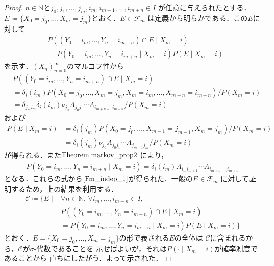\documentclass[dvipdfmx,autodetect-engine]{jsarticle}
\theoremstyle{remark}
\theoremstyle{definition}
\newcommand{\N}{\mathbb{N}}
\begin{document}
\begin{proof}
    $n \in \N$と$j_0,j_1,\ldots,j_m,i_m,i_{m+1},\ldots,i_{m+n} \in I$
    が任意に与えられたとする．
    $E \coloneqq \{X_0 = j_0,\ldots, X_m = j_m\}$とおく．$E \in \mathcal{F}_m$
    は定義から明らかである．この$E$に対して
    \begin{align}
        &P((Y_0=i_m,\ldots,Y_n = i_{m+n})\cap E \mid X_m = i ) \\
        &= 
        P(Y_0=i_m,\ldots,Y_n = i_{m+n} \mid X_m = i) P(E \mid X_m = i) \label{Fm_indep_1}
    \end{align}
    を示す．$(X_n)_{n=0}^{\infty}$のマルコフ性から
    \begin{align}
       &P((Y_0=i_m,\ldots,Y_n = i_{m+n})\cap E \mid X_m = i )\\
        &=\delta_i(i_m) P(X_{0} = j_{0},\ldots,
        X_m = j_m,X_m = i_m,\ldots, X_{m+n}=i_{m+n}) / P(X_m = i)\\
        &=\delta_{j_m i_m} \delta_i(i_m) \nu_{j_0} A_{j_0 j_1}  \cdots A_{i_{m+n-1} i_{m+n}} / P(X_m = i)
    \end{align}
    および
    \begin{align}
        P(E \mid X_m = i) &= 
        \delta_i(j_m) P(X_0=j_0,\ldots,X_{m-1}=j_{m-1},X_m = j_m) / P(X_m = i)\\
        &= \delta_i(j_m) \nu_{j_0} A_{j_0 j_1} \cdots A_{j_{m-1} j_m} / P(X_m = i)
    \end{align}
    が得られる．また$\mathrm{Theorem}\ref{markov_prop2}$により，
    \begin{align}
        P(Y_0=i_m,\ldots,Y_n = i_{m+n} \mid X_m = i) = 
        \delta_{i}(i_m) A_{i_m i_{m+1}} \cdots A_{i_{m+n-1} i_{m+n}}
    \end{align}
    となる．これらの式から$\eqref{Fm_indep_1}$が得られた．一般の$E \in \mathcal{F}_m$
    に対して証明するため，上の結果を利用する．
    \begin{align}
        \mathcal{C} \coloneqq \{E \mid  
        &\forall n \in \N,\, \forall i_m,\ldots,i_{m+n} \in I,\,\\
        &P((Y_0=i_m,\ldots,Y_n = i_{m+n})\cap E \mid X_m = i ) \\
        &= 
        P(Y_0=i_m,\ldots,Y_n = i_{m+n} \mid X_m = i) P(E \mid X_m = i) \}
    \end{align}
    とおく．$E = \{X_0 = j_0,\ldots, X_m = j_m\}$の形で表される$E$の全体は
    $\mathcal{C}$に含まれるから，$\mathcal{C}$が$\sigma$-代数であることを
    示せばよいが，それは$P(\cdot \mid X_m = i)$が確率測度であることから
    直ちにしたがう．よって示された．
\end{proof}
\end{document}
